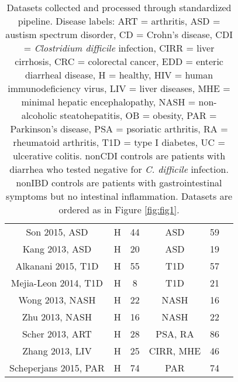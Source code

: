 {{\begin{table}[h]
{\begin{tabular}{c c c c c c}
	Son 2015, ASD & H & 44 & ASD & 59 & \cite{asd-son} \\
	Kang 2013, ASD & H & 20 & ASD & 19 & \cite{asd-kb} \\
	Alkanani 2015, T1D & H & 55 & T1D & 57 & \cite{t1d-alkanani} \\
	Mejia-Leon 2014, T1D & H & 8 & T1D & 21 & \cite{t1d-mejia} \\
	Wong 2013, NASH & H & 22 & NASH & 16 & \cite{nash-chan} \\
	Zhu 2013, NASH & H & 16 & NASH & 22 & \cite{nash-baker} \\
	Scher 2013, ART & H & 28 & PSA, RA & 86 & \cite{ra-littman} \\
	Zhang 2013, LIV & H & 25 & CIRR, MHE & 46 & \cite{mhe-zhang} \\
	Scheperjans 2015, PAR & H & 74 & PAR & 74 & \cite{par-schep} \\
	\hline
\end{tabular}}
\caption{Datasets collected and processed through standardized pipeline. Disease labels: ART = arthritis, ASD = austism spectrum disorder, CD = Crohn's disease, CDI = \textit{Clostridium difficile} infection, CIRR = liver cirrhosis, CRC = colorectal cancer, EDD = enteric diarrheal disease, H = healthy, HIV = human immunodeficiency virus, LIV = liver diseases,  MHE =  minimal hepatic encephalopathy, NASH = non-alcoholic steatohepatitis, OB = obesity, PAR = Parkinson's disease, PSA = psoriatic arthritis, RA = rheumatoid arthritis, T1D = type I diabetes, UC = ulcerative colitis. nonCDI controls are patients with diarrhea who tested negative for \textit{C. difficile} infection. nonIBD controls are patients  with gastrointestinal symptoms but no intestinal inflammation. Datasets are ordered as in Figure \ref{fig:fig1}.}\label{tab:datasets}
\end{table}
}

}
